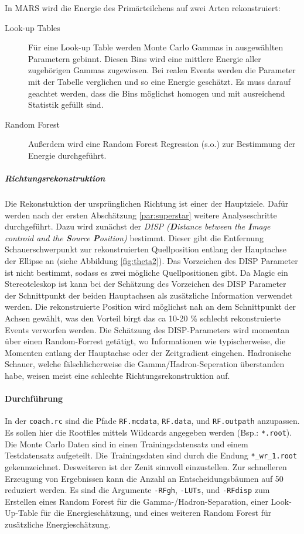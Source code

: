 In MARS wird die Energie des Primärteilchens auf zwei Arten rekonstruiert:
\begin{description}
	\item[\quad Look-up Tables] Für eine Look-up Table werden Monte Carlo 
		Gammas in ausgewählten Parametern gebinnt.
		Diesen Bins wird eine mittlere Energie aller
		zugehörigen Gammas zugewiesen.
		Bei realen Events werden die Parameter mit der Tabelle verglichen
		und so eine Energie geschätzt.
		Es muss darauf geachtet werden,
		dass die Bins möglichst homogen und mit ausreichend Statistik gefüllt sind.
	\item[\quad Random Forest] Außerdem wird eine Random Forest Regression (s.o.)
		zur Bestimmung der Energie durchgeführt.
\end{description}

\subparagraph{Richtungsrekonstruktion}%
\label{par:position}
Die Rekonstuktion der ursprünglichen Richtung ist einer der Hauptziele.
Dafür werden nach der ersten Abschätzung \ref{par:superstar} weitere 
Analyseschritte durchgeführt.
Dazu wird zunächst der \textit{DISP (\textbf{D}istance between the 
\textbf{I}mage controid and the \textbf{S}ource \textbf{P}osition)} bestimmt.
Dieser gibt die Entfernung Schauerschwerpunkt zur rekonstruierten Quellposition
entlang der Hauptachse der Ellipse an (siehe Abbildung \ref{fig:theta2}).
Das Vorzeichen des DISP Parameter ist nicht bestimmt, sodass es zwei mögliche
Quellpositionen gibt.
Da Magic ein Stereoteleskop ist kann bei der Schätzung des Vorzeichen des DISP
Parameter der Schnittpunkt der beiden Hauptachsen als zusätzliche Information
verwendet werden. 
Die rekonstruierte Position wird möglichst nah an dem Schnittpunkt der Achsen
gewählt, was den Vorteil birgt das ca 10-20 \% schlecht rekonstruierte Events
verworfen werden. 
Die Schätzung des DISP-Parameters wird momentan über einen Random-Forrest
getätigt, wo Informationen wie typischerweise, die Momenten entlang der 
Hauptachse oder der Zeitgradient eingehen.
Hadronische Schauer, welche fälschlicherweise die Gamma/Hadron-Seperation
überstanden habe, weisen meist eine schlechte Richtungsrekonstruktion auf. 

\paragraph{Durchführung}%
In der \texttt{coach.rc} sind die Pfade
\texttt{RF.mcdata},
\texttt{RF.data},
und \texttt{RF.outpath}
anzupassen.
Es sollen hier die Rootfiles mittels Wildcards angegeben werden
(Bsp.: \texttt{*.root}).
Die Monte Carlo Daten sind in einen Trainingsdatensatz
und einem Testdatensatz aufgeteilt.
Die Trainingsdaten sind durch die Endung
\texttt{*\_wr\_1.root} gekennzeichnet.
Desweiteren ist der Zenit sinnvoll einzustellen.
Zur schnelleren Erzeugung von Ergebnissen kann die Anzahl an
Entscheidungsbäumen auf \num{50}
reduziert werden.
Es sind die Argumente
\texttt{-RFgh}, \texttt{-LUTs}, und \texttt{-RFdisp}
zum Erstellen eines Random Forest für die Gamma-/Hadron-Separation,
einer Look-Up-Table für die Energieschätzung,
und eines weiteren Random Forest für zusätzliche Energieschätzung.

